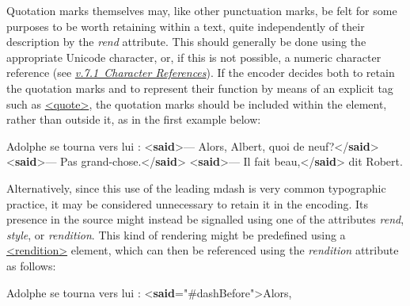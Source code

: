 Quotation marks themselves may, like other punctuation marks, be felt for some purposes to be worth retaining within a text, quite independently of their description by the {\itshape rend} attribute. This should generally be done using the appropriate Unicode character, or, if this is not possible, a numeric character reference (see \textit{\hyperref[SG-er]{v.7.1\ Character References}}). If the encoder decides both to retain the quotation marks and to represent their function by means of an explicit tag such as \hyperref[TEI.quote]{<quote>}, the quotation marks should be included within the element, rather than outside it, as in the first example below: \par\bgroup{}\exampleFont \begin{shaded}\noindent\mbox{}Adolphe se tourna vers lui :\mbox{}\newline 
{<\textbf{said}>}— Alors, Albert, quoi de neuf?{</\textbf{said}>}\mbox{}\newline 
{<\textbf{said}>}— Pas grand-chose.{</\textbf{said}>}\mbox{}\newline 
{<\textbf{said}>}— Il fait beau,{</\textbf{said}>} dit Robert.\end{shaded}\egroup\par \noindent  Alternatively, since this use of the leading mdash is very common typographic practice, it may be considered unnecessary to retain it in the encoding. Its presence in the source might instead be signalled using one of the attributes {\itshape rend}, {\itshape style}, or {\itshape rendition}. This kind of rendering might be predefined using a \hyperref[TEI.rendition]{<rendition>} element, which can then be referenced using the {\itshape rendition} attribute as follows: \par\bgroup{}\exampleFont \begin{shaded}\noindent\mbox{}Adolphe se tourna vers lui :\mbox{}\newline 
{<\textbf{said}\hspace*{1em}{rendition}="{\#dashBefore}">}Alors,\mbox{}\newline 

\end{shaded}
